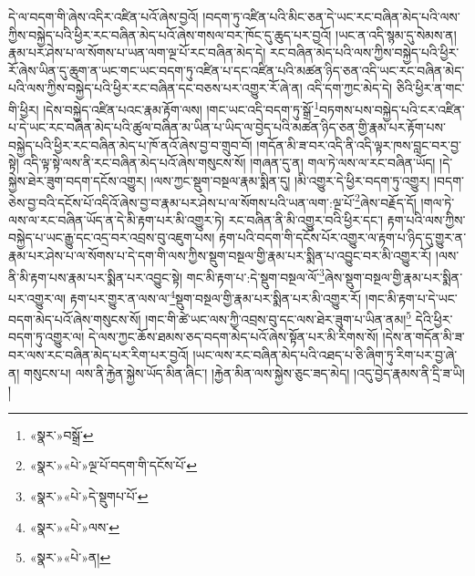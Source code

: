 དེ་ལ་བདག་གི་ཞེས་འདིར་འཛིན་པའོ་ཞེས་བྱའོ། །བདག་ཏུ་འཛིན་པའི་མིང་ཅན་དེ་ཡང་རང་བཞིན་མེད་པའི་ལས་ཀྱིས་བསྐྱེད་པའི་ཕྱིར་རང་བཞིན་མེད་པའོ་ཞེས་གསལ་བར་ཁོང་དུ་ཆུད་པར་བྱའོ། །ཡང་ན་འདི་སྙམ་དུ་སེམས་ན། རྣམ་པར་ཤེས་པ་ལ་སོགས་པ་ཡན་ལག་ལྔ་པོ་རང་བཞིན་མེད་དེ། རང་བཞིན་མེད་པའི་ལས་ཀྱིས་བསྐྱེད་པའི་ཕྱིར་རོ་ཞེས་ཡིན་དུ་ཆུག་ན་ཡང་གང་ཡང་བདག་ཏུ་འཛིན་པ་དང་འཛིན་པའི་མཚན་ཉིད་ཅན་འདི་ཡང་རང་བཞིན་མེད་པའི་ལས་ཀྱིས་བསྐྱེད་པའི་ཕྱིར་རང་བཞིན་དང་བཅས་པར་འགྱུར་རོ་ཞེ་ན། འདི་དག་ཀྱང་མེད་དེ། ཅིའི་ཕྱིར་ན་གང་གི་ཕྱིར། །དེས་བསྐྱེད་འཛིན་པའང་རྣམ་རྟོག་ལས། །གང་ཡང་འདི་བདག་ཏུ་སྒྲོ་\footnote{«སྣར་»བསྒྲོ་}བཏགས་པས་བསྐྱེད་པའི་ངར་འཛིན་པ་དེ་ཡང་རང་བཞིན་མེད་པའི་ཚུལ་བཞིན་མ་ཡིན་པ་ཡིད་ལ་བྱེད་པའི་མཚན་ཉིད་ཅན་གྱི་རྣམ་པར་རྟོག་པས་བསྐྱེད་པའི་ཕྱིར་རང་བཞིན་མེད་པ་ཁོ་ནའོ་ཞེས་བྱ་བ་གྲུབ་བོ། །གདོན་མི་ཟ་བར་འདི་ནི་འདི་ལྟར་ཁས་བླང་བར་བྱ་སྟེ། འདི་ལྟ་སྟེ་ལས་ནི་རང་བཞིན་མེད་པའོ་ཞེས་གསུངས་སོ། །གཞན་དུ་ན། གལ་ཏེ་ལས་ལ་རང་བཞིན་ཡོད། །དེ་སྐྱེས་ཐེར་ཟུག་བདག་དངོས་འགྱུར། །ལས་ཀྱང་སྡུག་བསྔལ་རྣམ་སྨིན་དུ། །མི་འགྱུར་དེ་ཕྱིར་བདག་ཏུ་འགྱུར། །བདག་ཅེས་བྱ་བའི་དངོས་པོ་འདིའོ་ཞེས་བྱ་བ་རྣམ་པར་ཤེས་པ་ལ་སོགས་པའི་ཡན་ལག་:ལྔ་པོ་\footnote{«སྣར་»«པེ་»ལྔ་པོ་བདག་གི་དངོས་པོ་}ཞེས་བརྗོད་དོ། །གལ་ཏེ་ལས་ལ་རང་བཞིན་ཡོད་ན་དེ་མི་རྟག་པར་མི་འགྱུར་ཏེ། རང་བཞིན་ནི་མི་འགྱུར་བའི་ཕྱིར་དང་། རྟག་པའི་ལས་ཀྱིས་བསྐྱེད་པ་ཡང་རྒྱུ་དང་འདྲ་བར་འབྲས་བུ་འཇུག་པས། རྟག་པའི་བདག་གི་དངོས་པོར་འགྱུར་ལ་རྟག་པ་ཉིད་དུ་གྱུར་ན་རྣམ་པར་ཤེས་པ་ལ་སོགས་པ་དེ་དག་གི་ལས་ཀྱིས་སྡུག་བསྔལ་གྱི་རྣམ་པར་སྨིན་པ་འབྱུང་བར་མི་འགྱུར་རོ། །ལས་ནི་མི་རྟག་པས་རྣམ་པར་སྨིན་པར་འབྱུང་སྟེ། གང་མི་རྟག་པ་:དེ་སྡུག་བསྔལ་ལོ་\footnote{«སྣར་»«པེ་»དེ་སྡུགཔ་པོ་}ཞེས་སྡུག་བསྔལ་གྱི་རྣམ་པར་སྨིན་པར་འགྱུར་ལ། རྟག་པར་གྱུར་ན་ལས་ལ་\footnote{«སྣར་»«པེ་»ལས་}སྡུག་བསྔལ་གྱི་རྣམ་པར་སྨིན་པར་མི་འགྱུར་རོ། །གང་མི་རྟག་པ་དེ་ཡང་བདག་མེད་པའོ་ཞེས་གསུངས་སོ། །གང་གི་ཚེ་ཡང་ལས་ཀྱི་འབྲས་བུ་དང་ལས་ཐེར་ཟུག་པ་ཡིན་ནམ།\footnote{«སྣར་»«པེ་»ན།} དེའི་ཕྱིར་བདག་ཏུ་འགྱུར་ལ། དེ་ལས་ཀྱང་ཆོས་ཐམས་ཅད་བདག་མེད་པའོ་ཞེས་སྟོན་པར་མི་རིགས་སོ། །དེས་ན་གདོན་མི་ཟ་བར་ལས་རང་བཞིན་མེད་པར་རིག་པར་བྱའོ། །ཡང་ལས་རང་བཞིན་མེད་པའི་འཐད་པ་ཅི་ཞིག་ཏུ་རིག་པར་བྱ་ཞེ་ན། གསུངས་པ། ལས་ནི་རྐྱེན་སྐྱེས་ཡོད་མིན་ཞིང་། །རྐྱེན་མིན་ལས་སྐྱེས་ཅུང་ཟད་མེད། །འདུ་བྱེད་རྣམས་ནི་དྲི་ཟ་ཡི། །
